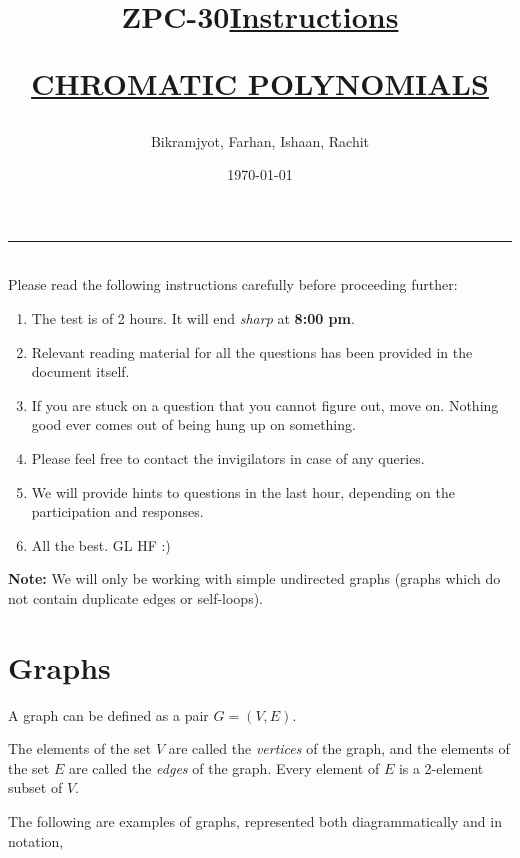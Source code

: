 \documentclass[12pt]{exam}
\title{ZPC-30}
\author{Bikramjyot, Farhan, Ishaan, Rachit}
\date{\today}
\begin{document}
\captionsetup{font=footnotesize}

\maketitle
\rule{\textwidth}{1pt}
\printanswers

\title{\textbf{\underline{\fontsize{18}{12}\selectfont Instructions}}}\\
Please read the following instructions carefully before proceeding further:\\
\begin{enumerate}
\item The test is of 2 hours. It will end \textit{sharp} at \textbf{8:00 pm}.
\item Relevant reading material for all the questions has been provided in the document itself.
\item If you are stuck on a question that you cannot figure out, move on. Nothing good ever comes out of being hung up on something.
\item Please feel free to contact the invigilators in case of any queries.
\item We will provide hints to questions in the last hour, depending on the participation and responses.
\item All the best. GL HF :)\\
\end{enumerate}
\bigskip
\maketitle
\newpage
\title{\begin{center}\textbf{\underline{\fontsize{16}{12}\selectfont CHROMATIC POLYNOMIALS}}\end{center}}

\textbf{Note:} We will only be working with simple undirected graphs (graphs which do not contain duplicate edges or self-loops).

\section{Graphs}

A graph can be defined as a pair $G=(V,E)$.

The elements of the set $V$ are called the \emph{vertices} of the graph, and the elements of the set $E$ are called the \emph{edges} of the graph. Every element of $E$ is a 2-element subset of $V$.  

The following are examples of graphs, represented both diagrammatically and in notation,
\end{document}
